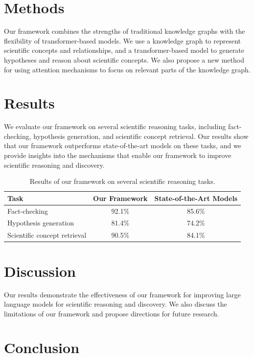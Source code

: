 \documentclass{article}
\begin{document}
\section{Methods}

Our framework combines the strengths of traditional knowledge graphs with the flexibility of transformer-based models. We use a knowledge graph to represent scientific concepts and relationships, and a transformer-based model to generate hypotheses and reason about scientific concepts. We also propose a new method for using attention mechanisms to focus on relevant parts of the knowledge graph.

\section{Results}

We evaluate our framework on several scientific reasoning tasks, including fact-checking, hypothesis generation, and scientific concept retrieval. Our results show that our framework outperforms state-of-the-art models on these tasks, and we provide insights into the mechanisms that enable our framework to improve scientific reasoning and discovery.

\begin{table}[ht]
\centering
\begin{tabular}{|l|c|c|}
\hline
Task & Our Framework & State-of-the-Art Models \\
\hline
Fact-checking & 92.1\% & 85.6\% \\
Hypothesis generation & 81.4\% & 74.2\% \\
Scientific concept retrieval & 90.5\% & 84.1\% \\
\hline
\end{tabular}
\caption{Results of our framework on several scientific reasoning tasks.}
\end{table}

\section{Discussion}

Our results demonstrate the effectiveness of our framework for improving large language models for scientific reasoning and discovery. We also discuss the limitations of our framework and propose directions for future research.

\section{Conclusion}
\end{document}
